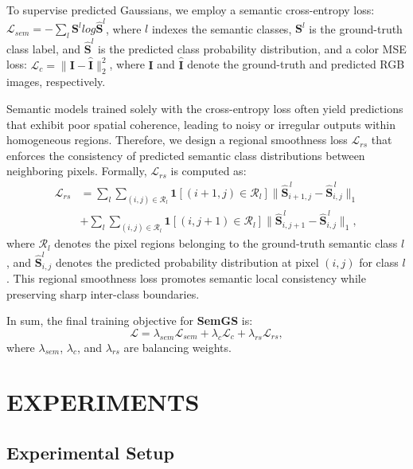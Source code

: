 \documentclass[letterpaper, 10 pt, conference]{ieeeconf}  %
\begin{document}
To supervise predicted Gaussians, we employ a semantic cross-entropy loss: $\mathcal{L}_{sem} = - \sum_{l}\mathbf{S}^{l} log\hat{\mathbf{S}}^{l}$, where $l$ indexes the semantic classes, $\mathbf{S}^{l}$ is the ground-truth class label, and $\hat{\mathbf{S}}^{l}$ is the predicted class probability distribution, and a color MSE loss: $\mathcal{L}_{c} = \| \mathbf{I} - \hat{\mathbf{I}} \|_2^2$, where $\mathbf{I}$ and $\hat{\mathbf{I}}$ denote the ground-truth and predicted RGB images, respectively.

Semantic models trained solely with the cross-entropy loss often yield predictions that exhibit poor spatial coherence, leading to noisy or irregular outputs within homogeneous regions. Therefore, we design a regional smoothness loss $\mathcal{L}_{rs}$ that enforces the consistency of predicted semantic class distributions between neighboring pixels. Formally, $\mathcal{L}_{rs}$ is computed as:
\begin{align}
\mathcal{L}_{rs} &=
\sum_{l}\sum_{(i,j)\in \mathcal{R}_l} 
\mathbf{1}[(i+1,j)\in\mathcal{R}_l] \|\hat{\mathbf{S}}_{i+1,j}^{\,l}-\hat{\mathbf{S}}_{i,j}^{\,l}\|_1 \nonumber \\
& + 
\sum_{l}\sum_{(i,j)\in \mathcal{R}_l} 
\mathbf{1}[(i,j+1)\in\mathcal{R}_l] \|\hat{\mathbf{S}}_{i,j+1}^{\,l}-\hat{\mathbf{S}}_{i,j}^{\,l}\|_1,
\end{align}
where $\mathcal{R}_l$ denotes the pixel regions belonging to the ground-truth semantic class $l$, and $\hat{\mathbf{S}}_{i,j}^{l}$ denotes the predicted probability distribution at pixel $(i,j)$ for class $l$.
This regional smoothness loss promotes semantic local consistency while preserving sharp inter-class boundaries.

In sum, the final training objective for \textbf{SemGS} is:
\begin{equation}
\mathcal{L} = \lambda_{sem} \mathcal{L}_{sem} + \lambda_c \mathcal{L}_{c} + \lambda_{rs} \mathcal{L}_{rs},
\end{equation}
where $\lambda_{sem}$, $\lambda_c$, and $\lambda_{rs}$ are balancing weights.

\section{EXPERIMENTS}

\subsection{Experimental Setup}
\end{document}
